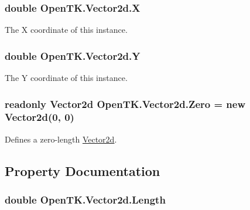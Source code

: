 \hypertarget{struct_open_t_k_1_1_vector2d_aef1217aed33a0d3273c53e67828274c3}{
\subsubsection[{X}]{\setlength{\rightskip}{0pt plus 5cm}double Open\-T\-K.\-Vector2d.\-X}}\label{struct_open_t_k_1_1_vector2d_aef1217aed33a0d3273c53e67828274c3}


The X coordinate of this instance.

\hypertarget{struct_open_t_k_1_1_vector2d_a2f7fee61d8a69fbfbbf221bad820927b}{
\subsubsection[{Y}]{\setlength{\rightskip}{0pt plus 5cm}double Open\-T\-K.\-Vector2d.\-Y}}\label{struct_open_t_k_1_1_vector2d_a2f7fee61d8a69fbfbbf221bad820927b}


The Y coordinate of this instance.

\hypertarget{struct_open_t_k_1_1_vector2d_a5b5b62970c7d37767d4d665068714638}{
\subsubsection[{Zero}]{\setlength{\rightskip}{0pt plus 5cm}readonly {\bf Vector2d} Open\-T\-K.\-Vector2d.\-Zero = new {\bf Vector2d}(0, 0)\hspace{0.3cm}{\ttfamily [static]}}}\label{struct_open_t_k_1_1_vector2d_a5b5b62970c7d37767d4d665068714638}


Defines a zero-\/length \hyperlink{struct_open_t_k_1_1_vector2d}{Vector2d}. 



\subsection{Property Documentation}
\hypertarget{struct_open_t_k_1_1_vector2d_a95c8cd7d1f964c7fb7e7ef0acf1487e4}{
\subsubsection[{Length}]{\setlength{\rightskip}{0pt plus 5cm}double Open\-T\-K.\-Vector2d.\-Length\hspace{0.3cm}{\ttfamily [get]}}}\label{struct_open_t_k_1_1_vector2d_a95c8cd7d1f964c7fb7e7ef0acf1487e4}


